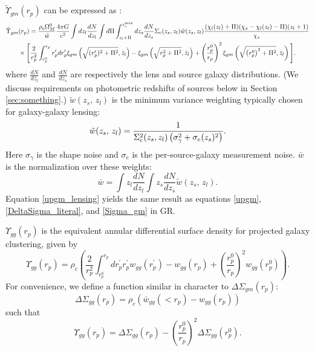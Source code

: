 \documentclass[onecolumn,amsmath,aps,fleqn, superscriptaddress]{revtex4}
\begin{document}
$\tilde{\Upsilon}_{gm}(r_p)$ can be expressed as \cite{Leonard2015}:
\begin{align}
\tilde{\Upsilon}_{gm}&(r_p)=\frac{\rho_c \Omega_M^0}{\bar{w}}\frac{4\pi G}{c^2} \int dz_l \frac{dN}{dz_l} \int d\Pi \int_{z_l+\Pi}^{z_s^{\rm max}} dz_s \frac{dN}{dz_s} \Sigma_{\rm c}(z_s, z_l) \tilde{w}(z_s, z_l)\frac{(\chi_l(z_l)+\Pi)(\chi_s-\chi_l(z_l)-\Pi)(z_l+1)}{\chi_s} \nonumber \\& \times\Bigg[\frac{2}{r_p^2}\int_{r_p^0}^{r_p}r_p'dr_p' \xi_{gm}\left(\sqrt{(r_p')^2+\Pi^2}, \bar{z}_l\right)-\xi_{gm}\left(\sqrt{r_p^2+\Pi^2}, \bar{z}_l\right)+\left(\frac{r_p^0}{r_p}\right)^2\xi_{gm}\left(\sqrt{\left(r_p^0\right)^2+\Pi^2}, \bar{z}_l\right)\Bigg].
\label{upgm_lensing}
\end{align}
where $\frac{dN}{dz_l}$ and  $\frac{dN}{dz_s}$ are respectively the lens and source galaxy distributions. (We discuss requirements on photometric redshifts of sources below in Section \ref{sec:something}.) $\tilde{w}(z_s,\,z_l)$ is the minimum variance weighting typically chosen for galaxy-galaxy lensing:
\begin{equation}
\tilde{w}(z_s,\, z_l) = \frac{1}{\Sigma_{\rm c}^2(z_s, z_l) \left(\sigma_\gamma^2 + \sigma_e(z_s)^2\right)}.
\label{weights}
\end{equation}
Here $\sigma_\gamma$ is the shape noise and $\sigma_e$ is the per-source-galaxy measurement noise. $\bar{w}$ is the normalization over these weights:
\begin{equation}
\bar{w} = \int z_l \frac{dN}{dz_l} \int z_s \frac{dN}{dz_s} \tilde{w}(z_s,\, z_l).
\label{wbar}
\end{equation}
Equation \ref{upgm_lensing} yields the same result as equations \ref{upgm}, \ref{DeltaSigma_literal}, and \ref{Sigma_gm} in GR.

$\Upsilon_{gg}(r_p)$ is the equivalent annular differential surface density for projected galaxy clustering, given by \cite{Baldauf2010}
\begin{equation}
\Upsilon_{gg}(r_p) = \rho_c \left( \frac{2}{r_p^2} \int_{r_p^0}^{r_p} d r_p^\prime r_p^\prime w_{gg}(r_p^\prime) - w_{gg}(r_p) + \left(\frac{r_p^0}{r_p}\right)^2 w_{gg}(r_p^0) \right).
\label{upgg}
\end{equation}
For convenience, we define a function similar in character to $\Delta \Sigma_{gm}(r_p)$:
\begin{equation}
\Delta \Sigma_{gg}(r_p) = \rho_c\left(\bar{w}_{gg}(< r_p) - w_{gg}(r_p)\right)
\label{DeltaSigma_gg}
\end{equation}
such that 
\begin{equation}
\Upsilon_{gg}(r_p) = \Delta\Sigma_{gg}(r_p) - \left(\frac{r_p^0}{r_p}\right)^2 \Delta \Sigma_{gg}(r_p^0).
\label{upgg_DS}
\end{equation}
\end{document}
